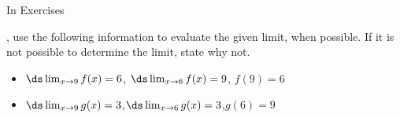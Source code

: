 {In Exercises
%
%
}
{%
, use the following information to evaluate the given limit, when possible. If it is not possible to determine the limit, state why not.
\begin{itemize}
	\item $\ds \lim_{x\to9}f(x) = 6$, \quad $\ds \lim_{x\to6} f(x) = 9$, \quad $f(9)=6$
	\item $\ds \lim_{x\to9}g(x) = 3$,\quad $\ds \lim_{x\to6} g(x) = 3$,\quad $g(6)=9$
\end{itemize}
}
